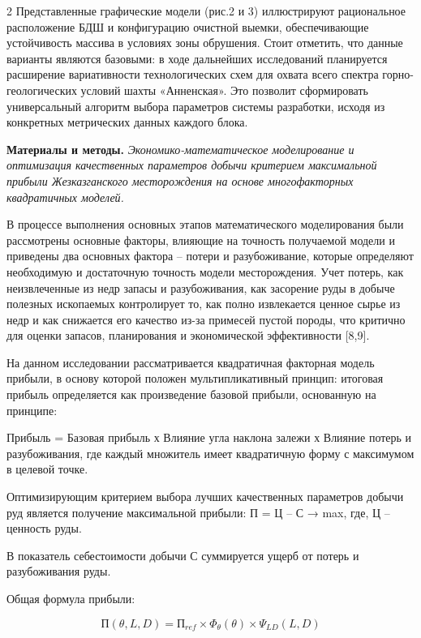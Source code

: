 \begin{multicols}{2}
Представленные графические модели (рис.2 и 3) иллюстрируют рациональное
расположение БДШ и конфигурацию очистной выемки, обеспечивающие
устойчивость массива в условиях зоны обрушения. Стоит отметить, что
данные варианты являются базовыми: в ходе дальнейших исследований
планируется расширение вариативности технологических схем для охвата
всего спектра горно-геологических условий шахты «Анненская». Это
позволит сформировать универсальный алгоритм выбора параметров системы
разработки, исходя из конкретных метрических данных каждого блока.

{\bfseries Материалы и методы.} \emph{Экономико-математическое
моделирование и оптимизация качественных параметров добычи критерием
максимальной прибыли Жезказганского месторождения на основе
многофакторных квадратичных моделей.}

В процессе выполнения основных этапов математического моделирования были
рассмотрены основные факторы, влияющие на точность получаемой модели и
приведены два основных фактора -- потери и разубоживание, которые
определяют необходимую и достаточную точность модели месторождения. Учет
потерь, как неизвлеченные из недр запасы и разубоживания, как засорение
руды в добыче полезных ископаемых контролирует то, как полно извлекается
ценное сырье из недр и как снижается его качество из-за примесей пустой
породы, что критично для оценки запасов, планирования и экономической
эффективности {[}8,9{]}.

На данном исследовании рассматривается квадратичная факторная модель
прибыли, в основу которой положен мультипликативный принцип: итоговая
прибыль определяется как произведение базовой прибыли, основанную на
принципе:

Прибыль = Базовая прибыль х Влияние угла наклона залежи х Влияние потерь
и разубоживания, где каждый множитель имеет квадратичную форму с
максимумом в целевой точке.

Оптимизирующим критерием выбора лучших качественных параметров добычи
руд является получение максимальной прибыли: П = Ц -- С → max,
где, Ц -- ценность руды.

В показатель себестоимости добычи С суммируется ущерб от потерь и
разубоживания руды.

Общая формула прибыли:

\begin{equation}
П(\theta,L,D) = П_{ref} \times \Phi_{\theta}(\theta) \times \Psi_{LD}(L,D)
\end{equation}


\end{multicols}
